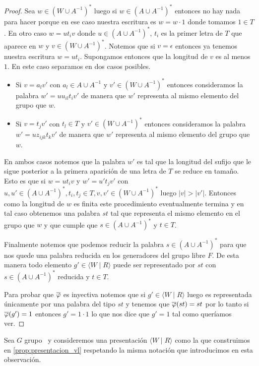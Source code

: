 \documentclass[tesis.tex]{subfiles}
\begin{document}
\begin{proof}
		Sea $w \in (W \cup A^{-1})^{*}$ luego si $w \in (A \cup A^{-1})^{*}$ entonces no hay nada para hacer porque en ese caso nuestra escritura es $w = w \cdot 1$ donde tomamos $1 \in T$.
		En otro caso $w = ut_{i}v$ donde $u \in (A \cup A^{-1})^{*}$, $t_{i}$ es la primer letra de $T$ que aparece en $w$ y $v \in (W \cup A^{-1})^{*}$.
		Notemos que si $v = \epsilon$ entonces ya tenemos nuestra escritura $w = ut_{i}$.
		Supongamos entonces que la longitud de $v$ es al menos $1$.
		En este caso separamos en dos casos posibles.
		\begin{itemize}
			\item Si $v = a_{l} v'$ con $a_{l} \in A \cup A^{-1}$ y $v' \in (W \cup A^{-1})^{*}$ entonces consideramos la palabra $w' = uu_{il}t_{i}v'$ de manera que $w'$ representa al mismo elemento del grupo que $w$.
			\item Si $v = t_{j} v'$ con $t_{l} \in T$ y $v' \in (W \cup A^{-1})^{*}$ entonces consideramos la palabra $w' = uz_{ijk}t_{k}v'$ de manera que $w'$ representa al mismo elemento del grupo que $w$.
		\end{itemize} 
		En ambos casos notemos que la palabra $w'$ es tal que la longitud del sufijo que le sigue posterior a la primera aparición de una letra de $T$ se reduce en tamaño.
		Esto es que si $w = ut_{i}v$ y $w' = u't_{j}v'$ con $u,u' \in (A \cup A^{-1})^{*}, t_{i}, t_{j} \in T, v,v' \in (W \cup A^{-1})^{*}$ luego 
		$|v| > |v'|$.
		Entonces como la longitud de $w$ es finita este procedimiento eventualmente termina y en tal caso obtenemos una palabra $st$ tal que representa el mismo elemento en el grupo que $w$ y que cumple que $s \in (A \cup A^{-1})^{*}$ y $t \in T$.

		Finalmente notemos que podemos reducir la palabra $s \in (A \cup A^{-1})^{*}$ para que nos quede una palabra reducida en los generadores del grupo libre $F$.
		De esta manera todo elemento $g' \in \langle W \mid R\rangle$ puede ser representado por $st$ con $s \in (A \cup A^{-1})^{*}$ reducida y $t \in T$. 
		

		Para probar que $\overline{ \varphi}$ es inyectiva notemos que si $g' \in \langle W \mid R \rangle$ luego es representada únicamente por una palabra del tipo $st$ y tenemos que $\overline{\varphi}(st) = st$ por lo tanto si $\overline{\varphi}(g') = 1$ entonces $g' = 1 \cdot 1$ lo que nos dice que $g' = 1$ tal como queríamos ver.

	\end{proof}



	Sea $G$ grupo \vl  \ y consideremos una presentación $\langle W  \mid  R \rangle$ como la que construimos en \ref{prop:presentacion_vl} respetando la misma notación que introducimos en esta observación.
	
\end{document}
